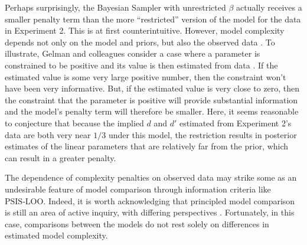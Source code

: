 \documentclass[
  man,floatsintext]{apa6}
\begin{document}
Perhaps surprisingly, the Bayesian Sampler with unrestricted \(\beta\) actually receives a smaller penalty term than the more ``restricted'' version of the model for the data in Experiment 2. This is at first counterintuitive. However, model complexity depends not only on the model and priors, but also the observed data \autocite[see][]{gelman.etal2014}. To illustrate, Gelman and colleagues consider a case where a parameter is constrained to be positive and its value is then estimated from data \autocite*{gelman.etal2014}. If the estimated value is some very large positive number, then the constraint won't have been very informative. But, if the estimated value is very close to zero, then the constraint that the parameter is positive will provide substantial information and the model's penalty term will therefore be smaller. Here, it seems reasonable to conjecture that because the implied \(d\) and \(d'\) estimated from Experiment 2's data are both very near \(1/3\) under this model, the restriction results in posterior estimates of the linear parameters that are relatively far from the prior, which can result in a greater penalty.

The dependence of complexity penalties on observed data may strike some as an undesirable feature of model comparison through information criteria like \(\text{PSIS-LOO}\). Indeed, it is worth acknowledging that principled model comparison is still an area of active inquiry, with differing perspectives \autocites[e.g.][]{gronau.wagenmakers2019,vehtari.etal2019}. Fortunately, in this case, comparisons between the models do not rest solely on differences in estimated model complexity.
\end{document}
